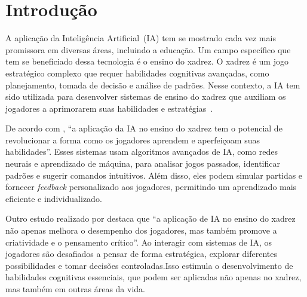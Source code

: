\documentclass[12pt,oneside,a4paper,chapter=TITLE,section=TITLE,sumario
=tradicional]{abntex2}
\begin{document}
\chapter{Introdução}
\label{cap:introducao}


%
%
%
%
%
%
%

A aplicação da Inteligência Artificial~(IA) tem se mostrado cada vez mais promissora em diversas áreas, incluindo a educação. Um campo específico que tem se beneficiado dessa tecnologia é o ensino do xadrez. O xadrez é um jogo estratégico complexo que requer habilidades cognitivas avançadas, como planejamento, tomada de decisão e análise de padrões. Nesse contexto, a IA tem sido utilizada para desenvolver sistemas de ensino do xadrez que auxiliam os jogadores a aprimorarem suas habilidades e estratégias~\cite{autor1, autor2}.

De acordo com , ``a aplicação da IA no ensino do xadrez tem o potencial de revolucionar a forma como os jogadores aprendem e aperfeiçoam suas habilidades''. Esses sistemas usam algoritmos avançados de IA, como redes neurais e aprendizado de máquina, para analisar jogos passados, identificar padrões e sugerir comandos intuitivos. Além disso, eles podem simular partidas e fornecer \textit{feedback} personalizado aos jogadores, permitindo um aprendizado mais eficiente e individualizado.

Outro estudo realizado por  destaca que ``a aplicação de IA no ensino do xadrez não apenas melhora o desempenho dos jogadores, mas também promove a criatividade e o pensamento crítico''. Ao interagir com sistemas de IA, os jogadores são desafiados a pensar de forma estratégica, explorar diferentes possibilidades e tomar decisões controladas.Isso estimula o desenvolvimento de habilidades cognitivas essenciais, que podem ser aplicadas não apenas no xadrez, mas também em outras áreas da vida.
\end{document}
